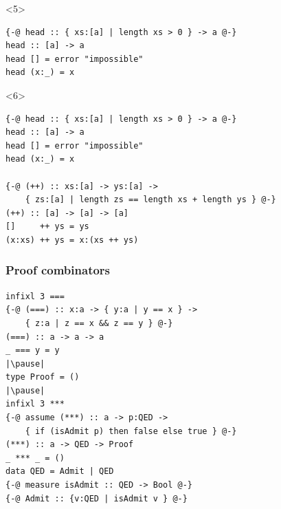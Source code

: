 \documentclass{beamer}
\begin{document}
\begin{frame}[fragile]
\begin{onlyenv}
\end{onlyenv}

\begin{onlyenv}<5>
\begin{verbatim}
{-@ head :: { xs:[a] | length xs > 0 } -> a @-}
head :: [a] -> a
head [] = error "impossible"
head (x:_) = x
\end{verbatim}
\end{onlyenv}

\begin{onlyenv}<6>
\begin{verbatim}
{-@ head :: { xs:[a] | length xs > 0 } -> a @-}
head :: [a] -> a
head [] = error "impossible"
head (x:_) = x

{-@ (++) :: xs:[a] -> ys:[a] ->
    { zs:[a] | length zs == length xs + length ys } @-}
(++) :: [a] -> [a] -> [a]
[]     ++ ys = ys
(x:xs) ++ ys = x:(xs ++ ys)
\end{verbatim}
\end{onlyenv}

\end{frame}

\begin{frame}[fragile]
\frametitle{Proof combinators}

\begin{verbatim}
infixl 3 ===
{-@ (===) :: x:a -> { y:a | y == x } ->
    { z:a | z == x && z == y } @-}
(===) :: a -> a -> a
_ === y = y
|\pause|
type Proof = ()
|\pause|
infixl 3 ***
{-@ assume (***) :: a -> p:QED ->
    { if (isAdmit p) then false else true } @-}
(***) :: a -> QED -> Proof
_ *** _ = ()
data QED = Admit | QED
{-@ measure isAdmit :: QED -> Bool @-}
{-@ Admit :: {v:QED | isAdmit v } @-}
\end{verbatim}


\end{frame}
\end{document}
